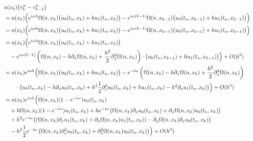 \begin{align}
\begin{split}
&a(x_k) \bigl( v^n_k - v^n_{k-1} \bigr)\\
&=
a(x_k) \Bigl( e^{i \omega k} \Omega(n,x_k) \bigl( u_0(t_n, x_k) + h u_1(t_n, x_k) \bigr)
- e^{i \omega (k-1)} \Omega(n,x_{k-1}) \bigl( u_0(t_n, x_{k-1}) + h u_1(t_n, x_{k-1}) \bigr) \Bigr)\\
&=
a(x_k) \Bigl( e^{i \omega k} \Omega(n,x_k) \bigl( u_0(t_n, x_k) + h u_1(t_n, x_k) \bigr)
- e^{i \omega (k-1)} \Omega(n,x_{k-1}) \bigl( u_0(t_n, x_{k-1}) + h u_1(t_n, x_{k-1}) \bigr) \Bigr)\\
&=
a(x_k) \Bigl( e^{i \omega k} \Omega(n,x_k) \bigl( u_0(t_n, x_k) + h u_1(t_n, x_k) \bigr)\\
&\quad - e^{i \omega (k-1)} \left( \Omega(n,x_k) - h \partial_x \Omega(n,x_k) + \frac {h^2}2 \partial^2_x \Omega(n,x_k) \right)
\cdot \bigl( u_0(t_n, x_{k-1}) + h u_1(t_n, x_{k-1}) \bigr) \Bigr) + O(h^3)\\
&=
a(x_k) e^{i \omega k} \Bigl( \Omega(n,x_k) \bigl( u_0(t_n, x_k) + h u_1(t_n, x_k) \bigr) - e^{- i \omega} \left( \Omega(n,x_k) - h \partial_x \Omega(n,x_k) + \frac {h^2}2 \partial^2_x \Omega(n,x_k) \right)\\
&\qquad \cdot \bigl( u_0(t_n, x_k) - h \partial_x u_0(t_n, x_k) + h^2 \frac{1}{2} \partial^2_x u_0(t_n, x_k) + h u_1(t_n, x_k) - h^2 \partial_x u_1(t_n, x_k) \bigr) \Bigr) + O(h^3)\\
&=
a(x_k) e^{i \omega k} \Bigl( \Omega(n,x_k) (1-e^{-i\omega}) u_0(t_n, x_k)\\
&\quad + h \Omega(n,x_k) (1 - e^{-i \omega}) u_1(t_n, x_k) + h e^{-i \omega} \bigl( \Omega(n,x_k) \partial_x u_0(t_n, x_k) + \partial_x \Omega(n,x_k)  u_0(t_n, x_k) \bigr)\\
&\quad + h^2 e^{-i\omega}  \bigl( \left( \Omega(n,x_k) \partial_x u_1(t_n, x_k) + \partial_x \Omega(n,x_k) u_1(t_n,x_k) \right) - \partial_x \Omega(n,x_k) \partial_x u_0(t_n, x_k) \bigr)\\
&\quad - h^2 \frac{1}{2} e^{-i\omega} \left( \Omega(n,x_k) \partial^2_x u_0(t_n, x_k) + \partial^2_x \Omega(n, x_k) u_0(t_n, x_k) \right)   \Bigr) + O(h^3)\\
\end{split}
\end{align}

